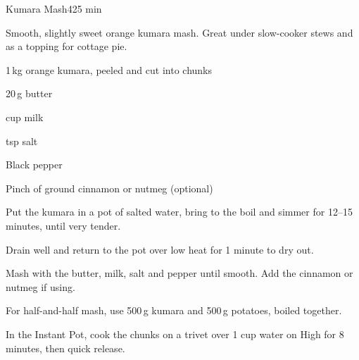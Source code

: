 \begin{recipebox}{Kumara Mash}{4}{25 min}

Smooth, slightly sweet orange kumara mash. Great under slow-cooker stews and
as a topping for cottage pie.

\begin{ingredients}
  \item 1\,kg orange kumara, peeled and cut into chunks
  \item 20\,g butter
  \item {} cup milk
  \item {} tsp salt
  \item Black pepper
  \item Pinch of ground cinnamon or nutmeg (optional)
\end{ingredients}

\begin{method}
  \item Put the kumara in a pot of salted water, bring to the boil and simmer for 12--15 minutes, until very tender.
  \item Drain well and return to the pot over low heat for 1 minute to dry out.
  \item Mash with the butter, milk, salt and pepper until smooth. Add the cinnamon or nutmeg if using.
\end{method}

\begin{notelist}
  \item For half-and-half mash, use 500\,g kumara and 500\,g potatoes, boiled together.
  \item In the Instant Pot, cook the chunks on a trivet over 1 cup water on High for 8 minutes, then quick release.
\end{notelist}

\end{recipebox}
